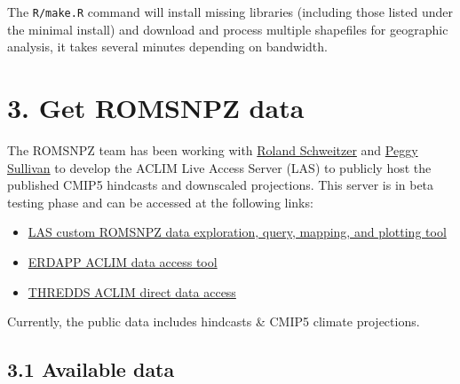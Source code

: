 \documentclass[
]{article}
\begin{document}
The \texttt{R/make.R} command will install missing libraries (including
those listed under the minimal install) and download and process
multiple shapefiles for geographic analysis, it takes several minutes
depending on bandwidth.

\hypertarget{get-romsnpz-data}{%
\section{3. Get ROMSNPZ data}\label{get-romsnpz-data}}

The ROMSNPZ team has been working with
\href{mailto:roland.schweitzer@noaa.gov}{Roland Schweitzer} and
\href{mailto:peggy.sullivan@noaa.gov}{Peggy Sullivan} to develop the
ACLIM Live Access Server (LAS) to publicly host the published CMIP5
hindcasts and downscaled projections. This server is in beta testing
phase and can be accessed at the following links:

\begin{itemize}
\item
  \href{https://data.pmel.noaa.gov/aclim/las/}{LAS custom ROMSNPZ data
  exploration, query, mapping, and plotting tool}
\item
  \href{https://data.pmel.noaa.gov/aclim/erddap/}{ERDAPP ACLIM data
  access tool}
\item
  \href{https://data.pmel.noaa.gov/aclim/thredds/}{THREDDS ACLIM direct
  data access}
\end{itemize}

Currently, the public data includes hindcasts \& CMIP5 climate
projections.

\hypertarget{available-data}{%
\subsection{3.1 Available data}\label{available-data}}
\end{document}
